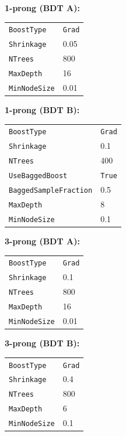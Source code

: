 \noindent
\begin{minipage}[t]{0.5\textwidth}
\noindent\textbf{1-prong (BDT A):}\\[0.3em]
\begin{tabular}{ll}
  \texttt{BoostType} & \texttt{Grad} \\
  \texttt{Shrinkage} & 0.05 \\
  \texttt{NTrees} & 800 \\
  \texttt{MaxDepth} & 16 \\
  \texttt{MinNodeSize} & 0.01 \\
\end{tabular}

\vspace*{1em}

\noindent\textbf{1-prong (BDT B):}\\[0.3em]
\begin{tabular}{ll}
  \texttt{BoostType} & \texttt{Grad} \\
  \texttt{Shrinkage} & 0.1 \\
  \texttt{NTrees} & 400 \\
  \texttt{UseBaggedBoost} & \texttt{True} \\
  \texttt{BaggedSampleFraction} & 0.5 \\
  \texttt{MaxDepth} & 8 \\
  \texttt{MinNodeSize} & 0.1 \\
\end{tabular}
\end{minipage}%
\begin{minipage}[t]{0.5\textwidth}
\noindent\textbf{3-prong (BDT A):}\\[0.3em]
\begin{tabular}{ll}
  \texttt{BoostType} & \texttt{Grad} \\
  \texttt{Shrinkage} & 0.1 \\
  \texttt{NTrees} & 800 \\
  \texttt{MaxDepth} & 16 \\
  \texttt{MinNodeSize} & 0.01 \\
\end{tabular}

\vspace*{1em}

\noindent\textbf{3-prong (BDT B):}\\[0.3em]
\begin{tabular}{ll}
  \texttt{BoostType} & \texttt{Grad} \\
  \texttt{Shrinkage} & 0.4 \\
  \texttt{NTrees} & 800 \\
  \texttt{MaxDepth} & 6 \\
  \texttt{MinNodeSize} & 0.1 \\
\end{tabular}
\end{minipage}%


